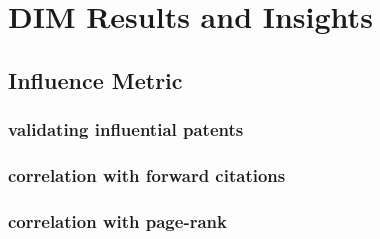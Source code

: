 
\chapter{DIM Results and Insights} %

\label{Chapter5} %



\section{Influence Metric}

\subsection{validating influential patents}

\subsection{correlation with forward citations}

\subsection{correlation with page-rank}




